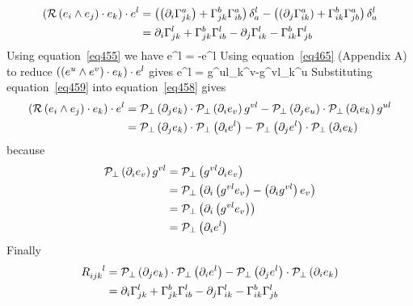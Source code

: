 \begin{align}
\left ( {{\mathcal{R}}\left ( {e_{i}\wedge e_{j}} \right )\cdot e_{k}} \right )\cdot e^{l} &= \left ( {\left ( {\partial_{i}\Gamma_{jk}^{a}} \right )+\Gamma_{jk}^{b}\Gamma_{ib}^{a}} \right )\delta_{a}^{l}
                                                   -\left ( {\left ( {\partial_{j}\Gamma_{ik}^{a}} \right )+\Gamma_{ik}^{b}\Gamma_{jb}^{a}} \right )\delta_{a}^{l} \nonumber \\
                                                   &= \partial_{i}\Gamma_{jk}^{l}+\Gamma_{jk}^{b}\Gamma_{ib}^{l}
                                                   -\partial_{j}\Gamma_{ik}^{l}-\Gamma_{ik}^{b}\Gamma_{jb}^{l}
\end{align}
Using equation~\ref{eq455} we have
\be\label{eq458}
\cdot e^{l} = -\cdot e^{l} 
\ee
Using equation~\ref{eq465} (Appendix A) to reduce $\left ( {\left ( {e^{u}\wedge e^{v}} \right )\cdot e_{k}} \right )\cdot e^{l}$ gives
\be\label{eq459}
\cdot e^{l} = g^{ul}\delta_{k}^{v}-g^{vl}\delta_{k}^{u}
\ee
Substituting equation~\ref{eq459} into equation~\ref{eq458} gives
\begin{align}
\left ( {{\mathcal{R}}\left ( {e_{i}\wedge e_{j}} \right )\cdot e_{k}} \right )\cdot e^{l} &= {\mathcal{P}_{\perp}}\left ( {\partial_{j} e_{k}} \right )\cdot {\mathcal{P}_{\perp}}\left ( {\partial_{i} e_{v}} \right ) g^{vl}
                                                    -{\mathcal{P}_{\perp}}\left ( {\partial_{j} e_{u}} \right )\cdot {\mathcal{P}_{\perp}}\left ( {\partial_{i} e_{k}} \right ) g^{ul} \nonumber \\
                                                   &= {\mathcal{P}_{\perp}}\left ( {\partial_{j} e_{k}} \right )\cdot {\mathcal{P}_{\perp}}\left ( {\partial_{i} e^{l}} \right )
                                                    -{\mathcal{P}_{\perp}}\left ( {\partial_{j} e^{l}} \right )\cdot {\mathcal{P}_{\perp}}\left ( {\partial_{i} e_{k}} \right )
\end{align}
because
\begin{align}
{\mathcal{P}_{\perp}}\left ( {\partial_{i} e_{v}} \right ) g^{vl} &= {\mathcal{P}_{\perp}}\left ( {g^{vl}\partial_{i} e_{v}} \right ) \nonumber \\
                                &= {\mathcal{P}_{\perp}}\left ( {\partial_{i}\left ( {g^{vl}e_{v}} \right )-\left ( {\partial_{i}g^{vl}} \right ) e_{v}} \right ) \nonumber \\
                                &= {\mathcal{P}_{\perp}}\left ( {\partial_{i}\left ( {g^{vl}e_{v}} \right )} \right ) \nonumber \\
                                &= {\mathcal{P}_{\perp}}\left ( {\partial_{i}e^{l}} \right )
\end{align}
Finally
\begin{align}
R\indices{_{ijk}^{l}} &= \Prjp{\partial_{j} e_{k}}\cdot \Prjp{\partial_{i} e^{l}}-\Prjp{\partial_{j} e^{l}}\cdot \Prjp{\partial_{i} e_{k}} \nonumber \\
                &= \partial_{i}\Gamma_{jk}^{l}+\Gamma_{jk}^{b}\Gamma_{ib}^{l}-\partial_{j}\Gamma_{ik}^{l}-\Gamma_{ik}^{b}\Gamma_{jb}^{l}       
\end{align}
